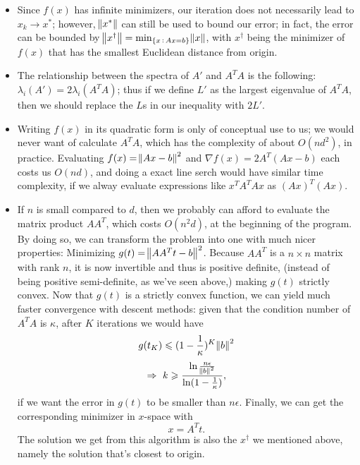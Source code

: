 \documentclass[11pt]{article}
\begin{document}
\begin{itemize}
\item Since $f(x)$ has infinite minimizers, our iteration does not necessarily lead to $x_k\to x^*$; however, $\norm{x^*}$ can still be used to bound our error; in fact, the error can be bounded by $\norm{x^{\dagger}}=\min_{\{x\,:\,Ax=b\}}\norm{x}$, with $x^{\dagger}$ being the minimizer of $f(x)$ that has the smallest Euclidean distance from origin.
\item The relationship between the spectra of $A'$ and $A^TA$ is the following: $\lambda_i(A') = 2\lambda_i(A^TA)$; thus if we define $L'$ as the largest eigenvalue of $A^TA$, then we should replace the $L$s in our inequality with $2L'$.
\item Writing $f(x)$ in its quadratic form is only of conceptual use to us; we would never want of calculate $A^TA$, which has the complexity of about $O(nd^2)$, in practice. Evaluating $f(x) = \norm{Ax-b}^2$ and $\nabla f(x) = 2A^T(Ax-b)$ each costs us $O(nd)$, and doing a exact line serch would have similar time complexity, if we alway evaluate expressions like $x^TA^TAx$ as $(Ax)^T(Ax)$. 
\item If $n$ is small compared to $d$, then we probably can afford to evaluate the matrix product $AA^T$, which costs $O(n^2d)$, at the beginning of the program. By doing so, we can transform the problem into one with much nicer properties: Minimizing $g(t) = \norm{AA^Tt-b}^2$. Because $AA^T$ is a $n\times n$ matrix with rank $n$, it is now invertible and thus is positive definite, (instead of being positive semi-definite, as we've seen above,) making $g(t)$ strictly convex. Now that $g(t)$ is a strictly convex function, we can yield much faster convergence with descent methods: given that the condition number of $A^TA$ is $\kappa$, after $K$ iterations we would have $$g(t_K)\leqslant (1-\frac1{\kappa})^K\norm{b}^2$$
$$\Rightarrow\,\,k \geqslant \frac{\ln\frac{n\epsilon}{\norm{b}^2}}{\ln(1-\frac1{\kappa})},$$
if we want the error in $g(t)$ to be smaller than $n\epsilon$. Finally, we can get the corresponding minimizer in $x$-space with 
$$x = A^Tt.$$ The solution we get from this algorithm is also the $x^{\dagger}$ we mentioned above, namely the solution that's closest to origin. 
\end{itemize}
\end{document}
